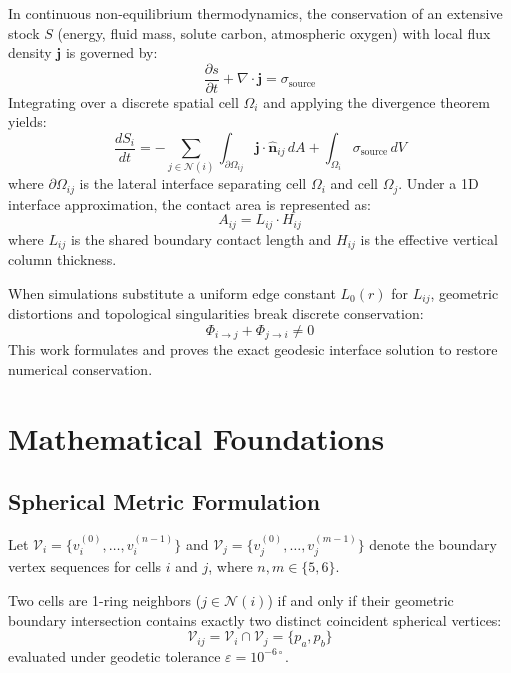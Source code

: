 \documentclass[10pt,twocolumn,letterpaper]{article}
\begin{document}
In continuous non-equilibrium thermodynamics, the conservation of an extensive stock $S$ (energy, fluid mass, solute carbon, atmospheric oxygen) with local flux density $\mathbf{j}$ is governed by:
\begin{equation}
\frac{\partial s}{\partial t} + \nabla \cdot \mathbf{j} = \sigma_{\text{source}}
\end{equation}
Integrating over a discrete spatial cell $\Omega_i$ and applying the divergence theorem yields:
\begin{equation}
\frac{d S_i}{dt} = - \sum_{j \in \mathcal{N}(i)} \int_{\partial \Omega_{ij}} \mathbf{j} \cdot \hat{\mathbf{n}}_{ij} \, dA + \int_{\Omega_i} \sigma_{\text{source}} \, dV
\end{equation}
where $\partial \Omega_{ij}$ is the lateral interface separating cell $\Omega_i$ and cell $\Omega_j$. Under a 1D interface approximation, the contact area is represented as:
\begin{equation}
A_{ij} = L_{ij} \cdot H_{ij}
\end{equation}
where $L_{ij}$ is the shared boundary contact length and $H_{ij}$ is the effective vertical column thickness.

When simulations substitute a uniform edge constant $L_0(r)$ for $L_{ij}$, geometric distortions and topological singularities break discrete conservation:
\begin{equation}
\Phi_{i \to j} + \Phi_{j \to i} \neq 0
\end{equation}
This work formulates and proves the exact geodesic interface solution to restore numerical conservation.

\section{Mathematical Foundations}

\subsection{Spherical Metric Formulation}
Let $\mathcal{V}_i = \{v_i^{(0)}, \dots, v_i^{(n-1)}\}$ and $\mathcal{V}_j = \{v_j^{(0)}, \dots, v_j^{(m-1)}\}$ denote the boundary vertex sequences for cells $i$ and $j$, where $n, m \in \{5, 6\}$. 

Two cells are 1-ring neighbors ($j \in \mathcal{N}(i)$) if and only if their geometric boundary intersection contains exactly two distinct coincident spherical vertices:
\begin{equation}
\mathcal{V}_{ij} = \mathcal{V}_i \cap \mathcal{V}_j = \{p_a, p_b\}
\end{equation}
evaluated under geodetic tolerance $\varepsilon = 10^{-6\circ}$.
\end{document}
